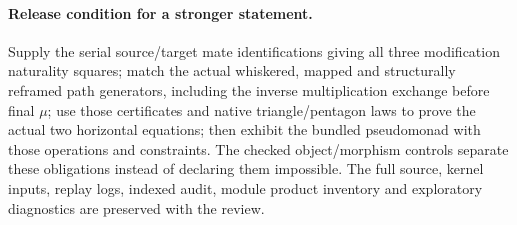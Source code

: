 \documentclass[11pt]{article}
\begin{document}
\paragraph{Release condition for a stronger statement.} Supply the serial source/target mate identifications giving all three modification naturality squares; match the actual whiskered, mapped and structurally reframed path generators, including the inverse multiplication exchange before final $\mu$; use those certificates and native triangle/pentagon laws to prove the actual two horizontal equations; then exhibit the bundled pseudomonad with those operations and constraints. The checked object/morphism controls separate these obligations instead of declaring them impossible. The full source, kernel inputs, replay logs, indexed audit, module product inventory and exploratory diagnostics are preserved with the review.
\end{document}
